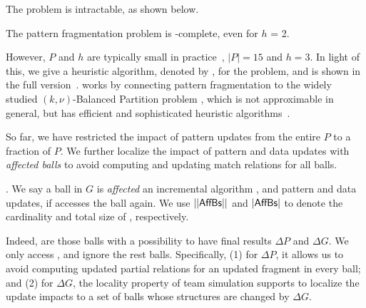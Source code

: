 \eat{%
Given $P$ and a positive integer $h$, the {\em pattern fragmentation}  problem is to find
an $h$-fragmentation of $P$ such that both $\max(|P_{fi}|)$ ($i\in[1,h]$) and $|C|$ are minimized.
%
Intuitively, we want (1)  to avoid skewed updates by making all fragments roughly the same size and (2) to  minimize the efforts to assemble the partial matches of all fragments.
}%

The problem is intractable, as shown below.

\vspace{-0.5ex}
\begin{prop}
	\label{prop-fragmentation}
	The pattern fragmentation problem is \NP-complete, even for $h$ = 2.
\end{prop}

\vspace{-0.5ex}
However, $P$ and $h$ are typically small in practice~\cite{FanLMTWW10}, \eg $|P|=15$ and $h=3$.
In light of this, we give a heuristic algorithm, denoted by , for the problem, and is shown in the
full version~\cite{fullvldb18}.
 works by connecting pattern fragmentation to the widely studied {\sc $(k, \nu)$-Balanced Partition} problem \cite{AndreevR06},
which is not approximable in general, but has efficient and sophisticated heuristic algorithms~\cite{metis-KarypisK98a}.

\vspace{1.0ex}
So far, we have restricted the impact of pattern updates from the entire $P$ to a fraction of $P$.
We further localize the impact of pattern and data updates  with {\em affected balls} to avoid computing and updating match relations for all balls.

.
We say a ball in $G$ is {\em affected} \wrt an incremental algorithm , and pattern and data updates,
if  accesses the ball again.
We use $||{\mathsf{AffBs}}||$ and $|{\mathsf{AffBs}}|$ to denote the cardinality and total size of \affballsx, respectively.


%
Indeed, \affballsx are those balls with a possibility to have final results \wrt $\Delta P$ and $\Delta G$.
We only access \affballsx, and ignore the rest balls.
Specifically, (1) for $\Delta P$, it allows us to avoid computing updated partial relations for an updated fragment in every ball;
and (2) for $\Delta G$, the locality property of team simulation supports to localize the update impacts to a set of balls whose structures are changed by $\Delta G$.

